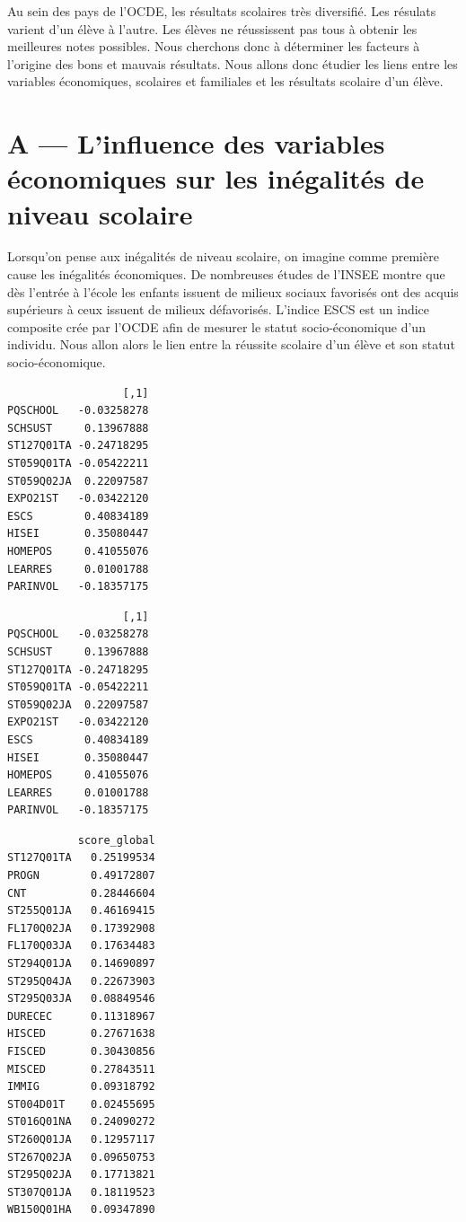 \documentclass[
  french,
  11pt,
  a4paper,
]{report}
\begin{document}
Au sein des pays de l'OCDE, les résultats scolaires très diversifié. Les
résulats varient d'un élève à l'autre. Les élèves ne réussissent pas
tous à obtenir les meilleures notes possibles. Nous cherchons donc à
déterminer les facteurs à l'origine des bons et mauvais résultats. Nous
allons donc étudier les liens entre les variables économiques, scolaires
et familiales et les résultats scolaire d'un élève.

\section{A --- L'influence des variables économiques sur les inégalités
de niveau
scolaire}\label{a-linfluence-des-variables-uxe9conomiques-sur-les-inuxe9galituxe9s-de-niveau-scolaire}

Lorsqu'on pense aux inégalités de niveau scolaire, on imagine comme
première cause les inégalités économiques. De nombreuses études de
l'INSEE montre que dès l'entrée à l'école les enfants issuent de milieux
sociaux favorisés ont des acquis supérieurs à ceux issuent de milieux
défavorisés. L'indice ESCS est un indice composite crée par l'OCDE afin
de mesurer le statut socio-économique d'un individu. Nous allon alors le
lien entre la réussite scolaire d'un élève et son statut
socio-économique.

\begin{verbatim}
                  [,1]
PQSCHOOL   -0.03258278
SCHSUST     0.13967888
ST127Q01TA -0.24718295
ST059Q01TA -0.05422211
ST059Q02JA  0.22097587
EXPO21ST   -0.03422120
ESCS        0.40834189
HISEI       0.35080447
HOMEPOS     0.41055076
LEARRES     0.01001788
PARINVOL   -0.18357175
\end{verbatim}

\begin{verbatim}
                  [,1]
PQSCHOOL   -0.03258278
SCHSUST     0.13967888
ST127Q01TA -0.24718295
ST059Q01TA -0.05422211
ST059Q02JA  0.22097587
EXPO21ST   -0.03422120
ESCS        0.40834189
HISEI       0.35080447
HOMEPOS     0.41055076
LEARRES     0.01001788
PARINVOL   -0.18357175
\end{verbatim}

\begin{verbatim}
           score_global
ST127Q01TA   0.25199534
PROGN        0.49172807
CNT          0.28446604
ST255Q01JA   0.46169415
FL170Q02JA   0.17392908
FL170Q03JA   0.17634483
ST294Q01JA   0.14690897
ST295Q04JA   0.22673903
ST295Q03JA   0.08849546
DURECEC      0.11318967
HISCED       0.27671638
FISCED       0.30430856
MISCED       0.27843511
IMMIG        0.09318792
ST004D01T    0.02455695
ST016Q01NA   0.24090272
ST260Q01JA   0.12957117
ST267Q02JA   0.09650753
ST295Q02JA   0.17713821
ST307Q01JA   0.18119523
WB150Q01HA   0.09347890
\end{verbatim}
\end{document}
